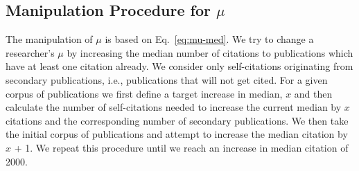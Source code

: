 \subsection{Manipulation Procedure for $\mu$}

The manipulation of $\mu$ is based on Eq.~\eqref{eq:mu-med}. We try to change a researcher's $\mu$ by increasing the median number of citations to publications which have at least one citation already. We consider only self-citations originating from secondary publications, i.e., publications that will not get cited. For a given corpus of publications we first define a target increase in median, $x$ and then calculate the number of self-citations needed to increase the current median by $x$ citations and the corresponding number of secondary publications. We then take the initial corpus of publications and attempt to increase the median citation by $x$ + 1. We repeat this procedure until we reach an increase in median citation of 2000.
